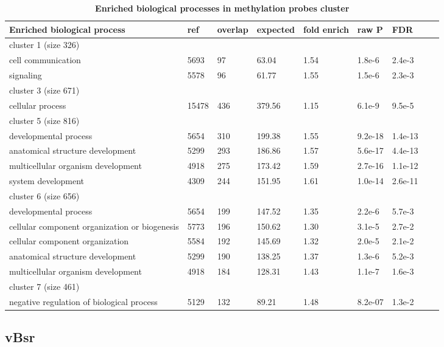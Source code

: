\documentclass{article}
\begin{document}
\begin{table*}[ht!]
\centering
\begin{tabular}{lllllllll}
  \toprule
Enriched biological process & ref & overlap & expected & fold enrich & raw P & FDR \\ 
  \midrule
  cluster 1 (size 326) \\
  \midrule
  cell communication & 5693 &  97 & 63.04 & 1.54 & 1.8e-6 & 2.4e-3 \\ 
  signaling & 5578 &  96 & 61.77 & 1.55 & 1.5e-6 & 2.3e-3 \\ 
   \midrule
   cluster 3 (size 671) \\
   \midrule
     cellular process & 15478 & 436 & 379.56 & 1.15 & 6.1e-9 & 9.5e-5 \\ 
\midrule
  cluster 5 (size 816)\\
  \midrule
  developmental process  & 5654 & 310 & 199.38 & 1.55 & 9.2e-18 & 1.4e-13 \\ 
  anatomical structure development & 5299 & 293 & 186.86 & 1.57 & 5.6e-17 & 4.4e-13 \\ 
  multicellular organism development & 4918 & 275 & 173.42 & 1.59 & 2.7e-16 & 1.1e-12 \\ 
  system development & 4309 & 244 & 151.95 & 1.61 & 1.0e-14 & 2.6e-11 \\ 
     \midrule
   cluster 6 (size 656)\\
  \midrule
  developmental process & 5654 & 199 & 147.52 & 1.35 & 2.2e-6 & 5.7e-3 \\ 
  cellular component organization or biogenesis & 5773 & 196 & 150.62 & 1.30 & 3.1e-5 & 2.7e-2 \\ 
  cellular component organization & 5584 & 192 & 145.69 & 1.32 & 2.0e-5 & 2.1e-2 \\ 
  anatomical structure development & 5299 & 190 & 138.25 & 1.37 & 1.3e-6 & 5.2e-3 \\ 
  multicellular organism development & 4918 & 184 & 128.31 & 1.43 & 1.1e-7 & 1.6e-3 \\ 
     \midrule
     cluster 7 (size 461) \\
     \midrule
     negative regulation of biological process & 5129 & 132 & 89.21 & 1.48 & 8.2e-07 & 1.3e-2 \\ 
	\bottomrule
\end{tabular}
\caption{\textbf{Enriched biological processes in \citet{figueroa2010dna} methylation probes cluster} }
\label{enriched}
\end{table*}

\subsection{vBsr}
\end{document}
